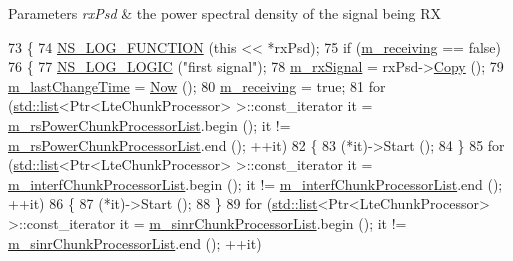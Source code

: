 \begin{DoxyParams}{Parameters}
{\em rx\+Psd} & the power spectral density of the signal being RX \\
\hline
\end{DoxyParams}

\begin{DoxyCode}
73 \{ 
74   \hyperlink{log-macros-disabled_8h_a90b90d5bad1f39cb1b64923ea94c0761}{NS\_LOG\_FUNCTION} (\textcolor{keyword}{this} << *rxPsd);
75   \textcolor{keywordflow}{if} (\hyperlink{classns3_1_1LteInterference_a12580fdb6df9e6afa3fc4f3c68648bf3}{m\_receiving} == \textcolor{keyword}{false})
76     \{
77       \hyperlink{group__logging_ga88acd260151caf2db9c0fc84997f45ce}{NS\_LOG\_LOGIC} (\textcolor{stringliteral}{"first signal"});
78       \hyperlink{classns3_1_1LteInterference_a110c40dd295d66897ca93e4bcc947dfa}{m\_rxSignal} = rxPsd->\hyperlink{classns3_1_1SpectrumValue_a2b5dc6d7a862e9036b2edd01cadaec69}{Copy} ();
79       \hyperlink{classns3_1_1LteInterference_ab694cd3b025f150e39b071e0f3d294a7}{m\_lastChangeTime} = \hyperlink{group__simulator_gac3635e2e87f7ce316c89290ee1b01d0d}{Now} ();
80       \hyperlink{classns3_1_1LteInterference_a12580fdb6df9e6afa3fc4f3c68648bf3}{m\_receiving} = \textcolor{keyword}{true};
81       \textcolor{keywordflow}{for} (\hyperlink{openflow-interface_8h_afd9bcfa176617760671b67580f536fa7}{std::list}<Ptr<LteChunkProcessor> >::const\_iterator it = 
      \hyperlink{classns3_1_1LteInterference_a4b261932ab7620cf1303dfbf4cdba6b5}{m\_rsPowerChunkProcessorList}.begin (); it != 
      \hyperlink{classns3_1_1LteInterference_a4b261932ab7620cf1303dfbf4cdba6b5}{m\_rsPowerChunkProcessorList}.end (); ++it)
82         \{
83           (*it)->Start ();
84         \}
85       \textcolor{keywordflow}{for} (\hyperlink{openflow-interface_8h_afd9bcfa176617760671b67580f536fa7}{std::list}<Ptr<LteChunkProcessor> >::const\_iterator it = 
      \hyperlink{classns3_1_1LteInterference_abd2337c56d85ec7775f6ae1e7c2036cc}{m\_interfChunkProcessorList}.begin (); it != 
      \hyperlink{classns3_1_1LteInterference_abd2337c56d85ec7775f6ae1e7c2036cc}{m\_interfChunkProcessorList}.end (); ++it)
86         \{
87           (*it)->Start ();
88         \}
89       \textcolor{keywordflow}{for} (\hyperlink{openflow-interface_8h_afd9bcfa176617760671b67580f536fa7}{std::list}<Ptr<LteChunkProcessor> >::const\_iterator it = 
      \hyperlink{classns3_1_1LteInterference_ad2b739da02cfdfd8cb49fd34a5d95b7d}{m\_sinrChunkProcessorList}.begin (); it != 
      \hyperlink{classns3_1_1LteInterference_ad2b739da02cfdfd8cb49fd34a5d95b7d}{m\_sinrChunkProcessorList}.end (); ++it)

\end{DoxyCode}
